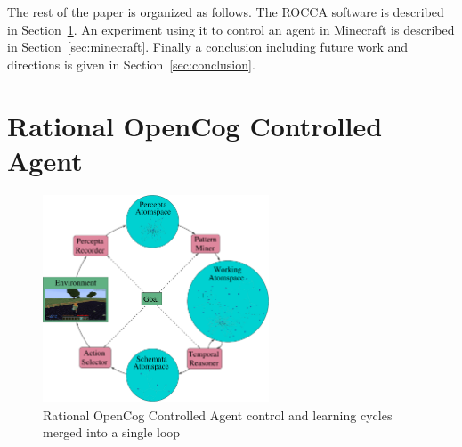 \documentclass[runningheads]{llncs}
\begin{document}




The rest of the paper is organized as follows.  The ROCCA software is
described in Section~\ref{sec:rocca}.  An experiment using it to
control an agent in Minecraft is described in
Section~\ref{sec:minecraft}.  Finally a conclusion including future
work and directions is given in Section~\ref{sec:conclusion}.


\section{Rational OpenCog Controlled Agent}
\label{sec:rocca}
\begin{figure}
  \centerline{\includegraphics[width=0.6\textwidth]{pictures/rocca-chart-v0.7.pdf}}
  \caption{Rational OpenCog Controlled Agent control and learning
    cycles merged into a single loop}
  \label{fig:rocca}
\end{figure}
\end{document}
